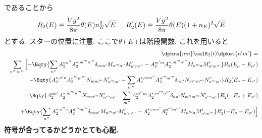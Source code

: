 \documentclass[10.5pt,a4paper]{jreport}
\begin{document}
であることから
\begin{eqnarray}
  R_2(E) \equiv \frac{Vg^2}{8\pi}\theta(E)n_E^2\sqrt{E}\hspace{0.5cm}R_2'(E) \equiv \frac{Vg^2}{8\pi}\theta(E)(1 + n_E)^2\sqrt{E}
\end{eqnarray}
とする. スターの位置に注意. ここで$\theta(E)$は階段関数. これを用いると
\begin{eqnarray}
  \nonumber &&\dpbra{nm}\calK_2(t)\dpket{n'm'} =\\
  \nonumber &&\sum_{n'''m'''}\Bigl[-\Bqty{\sum_{n''}A_2^{nn''}A_2^{*, m'''n'''}\delta_{mm'}M_{n'''n''}M_{n'm'''}' - A_2^{m'm}A_2^{*, m'''n'''}M_{n'''n}M_{n'm'''}'}R_2(E_\mu - E_{\mu'})\\
    \nonumber &&- \Bqty{A_2^{*, n'n}A_2^{n'''m'''}N_{mm'''}N_{n'''m'}' - \sum_{m''}A_2^{*, mm''}A_2^{n'''m'''}\delta_{nn'}N_{m''m'''}N_{n'''m'}'}R_2(E_\nu - E_{\nu'})\\
    \nonumber &&+ \Bqty{A_2^{nn'}A_2^{*, m'''n'''}N_{mm'''}N_{n'''m'}' - \sum_{m''}A_2^{m''m}A_2^{*, m'''n'''}\delta_{nn'}N_{m''m'''}N_{n'''m'}'}R_2'(-E_\nu + E_{\nu'})\\
    \nonumber&&+\Bqty{\sum_{n''}A_2^{*, n''n}A_2^{n'''m'''}\delta_{mm'}M_{n'''n''}M_{n'm'''}' - A_2^{*, mm'}A_2^{n'''m'''}M_{n'''n}M_{n'm'''}'}R_2'(- E_\mu + E_{\mu'})\Bigr]\\\label{K1}
\end{eqnarray}
\textbf{符号が合ってるかどうかとても心配.}
\end{document}
